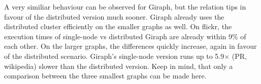 A very similiar behaviour can be observed for Giraph, but the relation tips in favour of the distributed version much sooner. Giraph already uses the distributed cluster efficiently on the smaller graphs as well.
On flickr, the execution times of single-node vs distributed Giraph are already within 9\% of each other.
On the larger graphs, the differences quickly increase, again in favour of the distributed scenario. Giraph's single-node version runs up to 5.9$\times$ (PR, wikipedia) slower than the distributed version.
Keep in mind, that only a comparison between the three smallest graphs can be made here.



